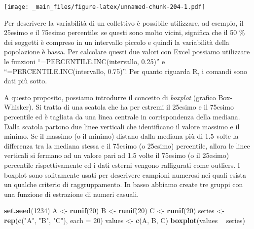 \documentclass[a4paper,12pt,oneside]{book}
\newenvironment{Shaded}{\begin{snugshade}}{\end{snugshade}}
\newcommand{\KeywordTok}[1]{\textcolor[rgb]{0.13,0.29,0.53}{\textbf{#1}}}
\newcommand{\DataTypeTok}[1]{\textcolor[rgb]{0.13,0.29,0.53}{#1}}
\newcommand{\DecValTok}[1]{\textcolor[rgb]{0.00,0.00,0.81}{#1}}
\newcommand{\FloatTok}[1]{\textcolor[rgb]{0.00,0.00,0.81}{#1}}
\newcommand{\StringTok}[1]{\textcolor[rgb]{0.31,0.60,0.02}{#1}}
\newcommand{\OperatorTok}[1]{\textcolor[rgb]{0.81,0.36,0.00}{\textbf{#1}}}
\newcommand{\NormalTok}[1]{#1}
\theoremstyle{definition}
\theoremstyle{definition}
\theoremstyle{definition}
\theoremstyle{remark}
\begin{document}
\texttt{[image: \_main\_files/figure-latex/unnamed-chunk-204-1.pdf]}

Per descrivere la variabilità di un collettivo è possibile utilizzare,
ad esempio, il 25esimo e il 75esimo percentile: se questi sono molto
vicini, significa che il 50 \% dei soggetti è compreso in un intervallo
piccolo e quindi la variabilità della popolazione è bassa. Per calcolare
questi due valori con Excel possiamo utilizzare le funzioni
``=PERCENTILE.INC(intervallo, 0.25)'' e ``=PERCENTILE.INC(intervallo,
0.75)''. Per quanto riguarda R, i comandi sono dati più sotto.

\begin{Shaded}
\end{Shaded}

A questo proposito, possiamo introdurre il concetto di \emph{boxplot}
(grafico Box-Whisker). Si tratta di una scatola che ha per estremi il
25esimo e il 75esimo percentile ed è tagliata da una linea centrale in
corrispondenza della mediana. Dalla scatola partono due linee verticali
che identificano il valore massimo e il minimo. Se il massimo (o il
minimo) distano dalla mediana più di 1.5 volte la differenza tra la
mediana stessa e il 75esimo (o 25esimo) percentile, allora le linee
verticali si fermano ad un valore pari ad 1.5 volte il 75esimo (o il
25esimo) percentile rispettivamente ed i dati esterni vengono
raffigurati come outliers. I boxplot sono solitamente usati per
descrivere campioni numerosi nei quali esista un qualche criterio di
raggruppamento. In basso abbiamo create tre gruppi con una funzione di
estrazione di numeri casuali.

\begin{Shaded}
\begin{Highlighting}[]
\KeywordTok{set.seed}\NormalTok{(}\DecValTok{1234}\NormalTok{)}
\NormalTok{A <-}\StringTok{ }\KeywordTok{runif}\NormalTok{(}\DecValTok{20}\NormalTok{)}
\NormalTok{B <-}\StringTok{ }\KeywordTok{runif}\NormalTok{(}\DecValTok{20}\NormalTok{)}
\NormalTok{C <-}\StringTok{ }\KeywordTok{runif}\NormalTok{(}\DecValTok{20}\NormalTok{)}
\NormalTok{series <-}\StringTok{ }\KeywordTok{rep}\NormalTok{(}\KeywordTok{c}\NormalTok{(}\StringTok{"A"}\NormalTok{, }\StringTok{"B"}\NormalTok{, }\StringTok{"C"}\NormalTok{), }\DataTypeTok{each =} \DecValTok{20}\NormalTok{)}
\NormalTok{values <-}\StringTok{ }\KeywordTok{c}\NormalTok{(A, B, C)}
\KeywordTok{boxplot}\NormalTok{(values }\OperatorTok{~}\StringTok{ }\NormalTok{series)}
\end{Highlighting}
\end{Shaded}
\end{document}
